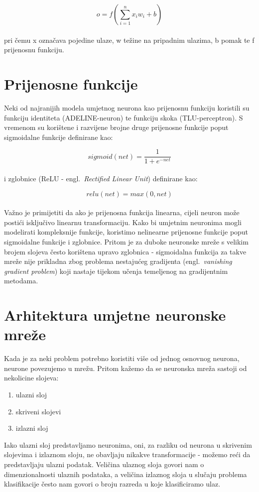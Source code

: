 \documentclass[times, utf8, zavrsni, numeric]{fer}
\begin{document}
\begin{equation}
    o = f(\sum_{i=1}^{n}x_{i} w_{i} + b)
    \label{eq:neuron}
\end{equation}
\\
\noindent pri čemu x označava pojedine ulaze, w težine na pripadnim ulazima, b pomak te f prijenosnu funkciju. 

\section{Prijenosne funkcije}
Neki od najranijih modela umjetnog neurona kao prijenosnu funkciju koristili su funkciju identiteta (ADELINE-neuron) te funkciju skoka (TLU-perceptron).
S vremenom su korištene i razvijene brojne druge prijenosne funkcije poput sigmoidalne funkcije definirane kao:

\begin{equation}
    sigmoid(net) = \frac{1}{1 + e^{-net}}
    \label{eq:sigmoid}
\end{equation}
\\
\noindent i zglobnice (ReLU - engl.\ \textit{Rectified Linear Unit}) definirane kao:

\begin{equation}
    relu(net) = max(0, net)
    \label{eq:relu}
\end{equation}
\\
\noindent Važno je primijetiti da ako je prijenosna funkcija linearna, cijeli neuron može postići isključivo linearnu transformaciju. 
Kako bi umjetnim neuronima mogli modelirati kompleksnije funkcije, koristimo nelinearne prijenosne funkcije poput sigmoidalne funkcije i zglobnice. 
Pritom je za duboke neuronske mreže s velikim brojem slojeva često korištena upravo zglobnica - 
sigmoidalna funkcija za takve mreže nije prikladna zbog problema nestajućeg gradijenta (engl.\ \textit{vanishing gradient problem}) koji nastaje tijekom učenja temeljenog na gradijentnim metodama.

\section{Arhitektura umjetne neuronske mreže}
Kada je za neki problem potrebno koristiti više od jednog osnovnog neurona, neurone povezujemo u mrežu. Pritom kažemo da se neuronska mreža sastoji od nekolicine slojeva:
\begin{enumerate}
    \item ulazni sloj
    \item skriveni slojevi
    \item izlazni sloj
\end{enumerate}
Iako ulazni sloj predstavljamo neuronima, oni, za razliku od neurona u skrivenim slojevima i izlaznom sloju, ne obavljaju nikakve transformacije - možemo reći da predstavljaju ulazni podatak.
Veličina ulaznog sloja govori nam o dimenzionalnosti ulaznih podataka, a veličina izlaznog sloja u slučaju problema klasifikacije često nam govori o broju razreda u koje klasificiramo ulaz. 
\end{document}
